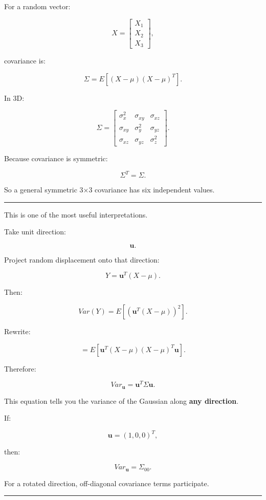 For a random vector:

\[
X=
\begin{bmatrix}
X_1\\
X_2\\
X_3
\end{bmatrix},
\]

covariance is:

\[
\boxed{
\Sigma
=
E[
(X-\mu)
(X-\mu)^T
].
}
\]

In 3D:

\[
\Sigma=
\begin{bmatrix}
\sigma_x^2 & \sigma_{xy} & \sigma_{xz}\\
\sigma_{xy} & \sigma_y^2 & \sigma_{yz}\\
\sigma_{xz} & \sigma_{yz} & \sigma_z^2
\end{bmatrix}.
\]

Because covariance is symmetric:

\[
\Sigma^T=\Sigma.
\]

So a general symmetric 3×3 covariance has six independent values.

\begin{center}\rule{0.5\linewidth}{0.5pt}\end{center}

This is one of the most useful interpretations.

Take unit direction:

\[
\mathbf u.
\]

Project random displacement onto that direction:

\[
Y=
\mathbf u^T(X-\mu).
\]

Then:

\[
Var(Y)
=
E[
(\mathbf u^T(X-\mu))^2
].
\]

Rewrite:

\[
=
E[
\mathbf u^T
(X-\mu)(X-\mu)^T
\mathbf u
].
\]

Therefore:

\[
\boxed{
Var_{\mathbf u}
=
\mathbf u^T
\Sigma
\mathbf u.
}
\]

This equation tells you the variance of the Gaussian along \textbf{any direction}.

If:

\[
\mathbf u=
(1,0,0)^T,
\]

then:

\[
Var_{\mathbf u}
=
\Sigma_{00}.
\]

For a rotated direction, off-diagonal covariance terms participate.

\begin{center}\rule{0.5\linewidth}{0.5pt}\end{center}

